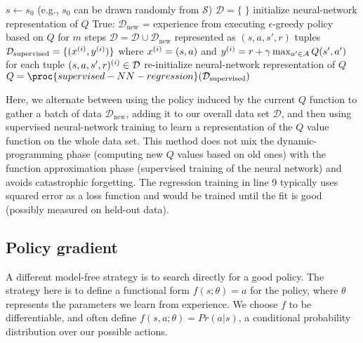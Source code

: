 \begin{codebox}
  \li $s \gets s_0$ \Comment (e.g., $s_0$ can be drawn randomly from $\mathcal{S}$)
  \li $\mathcal{D} = \{\;\}$
  \li initialize neural-network representation of $Q$
  \li \While True: \Do
  \li  $\mathcal{D}_\text{new}$ = experience from executing $\epsilon$-greedy policy based
  on $Q$ for $m$ steps
  \li $\mathcal{D} = \mathcal{D} \cup \mathcal{D}_\text{new}$ represented
  as $(s, a, s', r)$ tuples
  \li $\mathcal{D}_\text{supervised} = \{(x^{(i)}, y^{(i)})\}$  where $x^{(i)} =
    (s, a)$ and $y^{(i)} = r + \gamma \max_{a' \in \mathcal{A}} Q(s', a')$
  \li \;\;\;for each tuple $(s, a, s', r)^{(i)} \in \mathcal{D}$
  \li re-initialize neural-network representation of $Q$
  \li $Q = \proc{supervised-NN-regression}(\mathcal{D}_\text{supervised})$
  \End
\end{codebox}

Here, we alternate between using the policy induced by the current $Q$
function to gather a batch of data $\mathcal{D}_\text{new}$, adding it
to our overall data set $\mathcal{D}$, and then using supervised
neural-network training to learn a representation of the $Q$ value
function on the whole data set.  This method does not mix the
dynamic-programming phase (computing new $Q$ values based on old ones)
with the function approximation phase (supervised training of the
neural network) and avoids catastrophic forgetting.  The regression
training in line 9 typically uses squared error as a loss function and
would be trained until the fit is good (possibly measured on held-out
data).




\subsection{Policy gradient}
\label{sec-rl_policy_search}

A different model-free strategy is to search directly for a good
policy.  The strategy here is to define a functional form $f(s;\theta)
  = a$ for the policy, where $\theta$ represents the parameters we learn
from experience. We choose $f$ to be differentiable, and often define 
$f(s, a;\theta) = Pr(a|s)$, a conditional probability distribution over
our possible actions.

